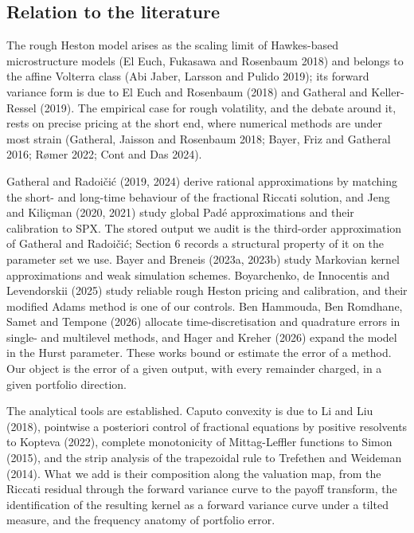 \documentclass[11pt,a4paper]{article}
\begin{document}
\setcounter{subsection}{3}\subsection{Relation to the literature}

The rough Heston model arises as the scaling limit of Hawkes-based microstructure models (El Euch, Fukasawa and Rosenbaum 2018) and belongs to the affine Volterra class (Abi Jaber, Larsson and Pulido 2019); its forward variance form is due to El Euch and Rosenbaum (2018) and Gatheral and Keller-Ressel (2019). The empirical case for rough volatility, and the debate around it, rests on precise pricing at the short end, where numerical methods are under most strain (Gatheral, Jaisson and Rosenbaum 2018; Bayer, Friz and Gatheral 2016; Rømer 2022; Cont and Das 2024).

Gatheral and Radoičić (2019, 2024) derive rational approximations by matching the short- and long-time behaviour of the fractional Riccati solution, and Jeng and Kiliçman (2020, 2021) study global Padé approximations and their calibration to SPX. The stored output we audit is the third-order approximation of Gatheral and Radoičić; Section 6 records a structural property of it on the parameter set we use. Bayer and Breneis (2023a, 2023b) study Markovian kernel approximations and weak simulation schemes. Boyarchenko, de Innocentis and Levendorskii (2025) study reliable rough Heston pricing and calibration, and their modified Adams method is one of our controls. Ben Hammouda, Ben Romdhane, Samet and Tempone (2026) allocate time-discretisation and quadrature errors in single- and multilevel methods, and Hager and Kreher (2026) expand the model in the Hurst parameter. These works bound or estimate the error of a method. Our object is the error of a given output, with every remainder charged, in a given portfolio direction.

The analytical tools are established. Caputo convexity is due to Li and Liu (2018), pointwise a posteriori control of fractional equations by positive resolvents to Kopteva (2022), complete monotonicity of Mittag-Leffler functions to Simon (2015), and the strip analysis of the trapezoidal rule to Trefethen and Weideman (2014). What we add is their composition along the valuation map, from the Riccati residual through the forward variance curve to the payoff transform, the identification of the resulting kernel as a forward variance curve under a tilted measure, and the frequency anatomy of portfolio error.
\end{document}
